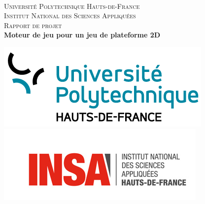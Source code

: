 \documentclass[12pt, openany]{report}
\newcommand{\HRule}{\rule{\linewidth}{0.5mm}}
\begin{document}
\begin{titlepage}
  \begin{rmfamily}
  \begin{center}

    ~\\[2cm]

    \textsc{\LARGE Universit\'e Polytechnique Hauts-de-France}~\\[0.5cm]
    \textsc{\LARGE Institut National des Sciences Appliqu\'ees}\\[2cm]

    \textsc{\Large Rapport de projet}\\[2cm]

    { \Huge \bfseries Moteur de jeu pour un jeu de plateforme 2D\\[2cm] }

    \includegraphics[scale=0.8]{uphf.png}
    \\
    \includegraphics[scale=1]{insa.JPG}
    \\[1cm]



\end{center}
\end{rmfamily}
\end{titlepage}
\end{document}
